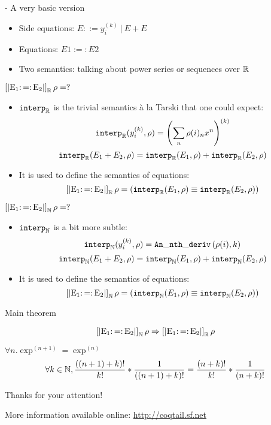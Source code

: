 \documentclass{beamer}
\begin{document}
\begin{frame}{\solve{} - A very basic version}
\begin{itemize}
 \item Side equations: $E ::= y_i^{(k)} ~|~ E + E$
 \item<2-> Equations: $E1 :=: E2$
 \item<3-> Two semantics: talking about power series or sequences over $\R$
\end{itemize}
\end{frame}

\begin{frame}{$\SemR = ?$}
\begin{itemize}
\item $\IR$ is the trivial semantics à la Tarski that one could expect:
$$\IR (y^{(k)}_i, \rho) = \left(\sum_n \rho(i)_n x ^ n\right)^{(k)}$$
$$\IR (E_1 + E_2, \rho) = \IR(E_1, \rho) + \IR(E_2, \rho)$$

\bigskip

\item<2-> It is used to define the semantics of equations:
$$\SemR = (\IR(E_1, \rho) \equiv \IR(E_2, \rho))$$
\end{itemize}
\end{frame}

\begin{frame}{$\SemN = ?$}
\begin{itemize}
\item $\IN$ is a bit more subtle:
$$\IN (y^{(k)}_i, \rho) = \Dn{}(\rho(i), k)$$
$$\IN (E_1 + E_2, \rho) = \IN(E_1, \rho) + \IN(E_2, \rho)$$

\bigskip

\item<2-> It is used to define the semantics of equations:
$$\SemN = (\IN(E_1, \rho) \equiv \IN(E_2, \rho))$$
\end{itemize}
\end{frame}

\begin{frame}{Main theorem}

$$\SemN \Rightarrow \SemR$$

\bigskip

\begin{exampleblock}{$\forall n. \exp^{(n +1)} = \exp^{(n)}$}
$$\forall k \in \N, \frac{((n+1) + k)!}{k!} * \frac{1}{((n+1)+k)!}
= \frac{(n+k)!}{k!} * \frac{1}{(n+k)!}$$
\end{exampleblock}
\end{frame}


\begin{frame}{Thanks for your attention!}

\begin{block}{More information available online:}
\url{http://coqtail.sf.net}
\end{block}

\end{frame}
\end{document}
